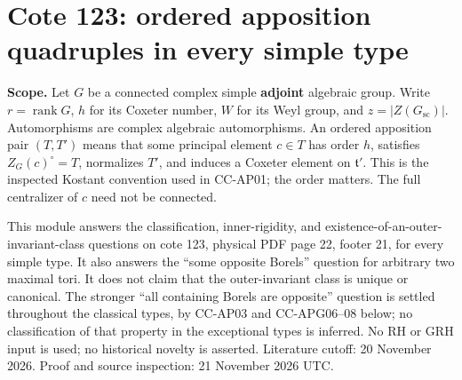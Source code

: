 \section{Cote 123: ordered apposition quadruples in every simple
type}\label{cote-123-ordered-apposition-quadruples-in-every-simple-type}

\textbf{Scope.} Let \(G\) be a connected complex simple \textbf{adjoint}
algebraic group. Write \(r=\operatorname{rank}G\), \(h\) for its Coxeter
number, \(W\) for its Weyl group, and \(z=|Z(G_{\mathrm{sc}})|\).
Automorphisms are complex algebraic automorphisms. An ordered apposition
pair \((T,T')\) means that some principal element \(c\in T\) has order
\(h\), satisfies \(Z_G(c)^\circ=T\), normalizes \(T'\), and induces a
Coxeter element on \(\mathfrak t'\). This is the inspected Kostant
convention used in CC-AP01; the order matters. The full centralizer of
\(c\) need not be connected.

This module answers the classification, inner-rigidity, and
existence-of-an-outer-invariant-class questions on cote 123, physical
PDF page 22, footer 21, for every simple type. It also answers the
``some opposite Borels'' question for arbitrary two maximal tori. It
does not claim that the outer-invariant class is unique or canonical.
The stronger ``all containing Borels are opposite'' question is settled
throughout the classical types, by CC-AP03 and CC-APG06--08 below; no
classification of that property in the exceptional types is inferred. No
RH or GRH input is used; no historical novelty is asserted. Literature
cutoff: 20 November 2026. Proof and source inspection: 21 November 2026
UTC.

